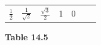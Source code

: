 {\begin{center}
\begin{xtabular*}{\mytablewidth}[t]{|p{10\mystarwidth}|p{10\mystarwidth}|p{10\mystarwidth}|p{10\mystarwidth}|p{10\mystarwidth}|p{10\mystarwidth}|p{10\mystarwidth}|}
                  \begin{math}\frac{1}{2}\end{math}
                 &
    
    
        
                  \begin{math}\frac{1}{\sqrt{2}}\end{math}
                 &
    
    
        
                  \begin{math}\frac{\sqrt{3}}{2}\end{math}
                 &
    
    
        1 &
    
    
        0%
     \tabularnewline{}
    \end{xtabular*}
      \end{center}
    \begin{center}{\small\bfseries Table 14.5}\end{center}
    
    \addtocounter{footnote}{-0}
    
        }%
      
    \par
  
